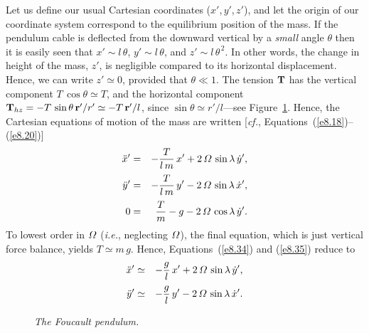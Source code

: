 Let us define our usual Cartesian coordinates ($x'$,\,$y'$,\,$z'$), and
let the origin of our coordinate system correspond to the equilibrium position
of the mass. If the pendulum cable is deflected from the downward vertical by a {\em small}\/ angle
$\theta$ then it is easily seen that $x'\sim  l\,\theta$, $y'\sim l\,\theta$,
and $z'\sim l\,\theta^{\,2}$. In other words, the change in height
of the mass, $z'$, is negligible compared to its horizontal displacement.
Hence, we can write $z'\simeq 0$, provided that $\theta\ll 1$. The
tension ${\bf T}$ has the vertical component $T\,\cos\theta\simeq T$,
and the horizontal component ${\bf T}_{hz}= - T\,\sin\theta\,{\bf r}'/r'\simeq
-T\,{\bf r}'/l$, since $\sin\theta \simeq r'/l$---see Figure~\ref{pend}. Hence, the
Cartesian equations of motion of the mass are written [{\em cf.}, Equations~(\ref{e8.18})--(\ref{e8.20})]
\begin{eqnarray}\label{e8.34}
\ddot{x}' &=& - \frac{T}{l\,m}\,x' + 2\,{\mit\Omega}\,\sin\lambda\,\dot{y}',
\\[0.5ex]
\ddot{y}' &=& - \frac{T}{l\,m}\,y' - 2\,{\mit\Omega}\,\sin\lambda\,\dot{x}',
\label{e8.35}\\[0.5ex]
0 &=& \frac{T}{m} - g - 2\,{\mit\Omega}\,\cos\lambda\,\dot{y}'.
\end{eqnarray}
To lowest order in ${\mit\Omega}$ ({\em i.e.}, neglecting ${\mit\Omega}$), the final equation, which is just vertical force balance, yields $T\simeq m\,g$.
Hence, Equations~(\ref{e8.34}) and (\ref{e8.35}) reduce to
\begin{eqnarray}\label{e8.37}
\ddot{x}' &\simeq& - \frac{g}{l}\,x' + 2\,{\mit\Omega}\,\sin\lambda\,\dot{y}',
\\[0.5ex]
\ddot{y}' &\simeq& - \frac{g}{l}\,y' - 2\,{\mit\Omega}\,\sin\lambda\,\dot{x}'.\label{e8.38}
\end{eqnarray}

\begin{figure}
\centerline{}
\caption{\em The Foucault pendulum.}\label{pend}
\end{figure}

